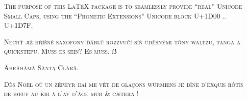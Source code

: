 \documentclass{scrartcl}
\begin{document}
\textsc{The purpose of this LaTeX package is to seamlessly provide “real” Unicode Small Caps, using the “Phonetic Extensions” Unicode block U+1D00 .. U+1D7F.}

\textsc{Nechť již hříšné saxofony ďáblů rozzvučí síň úděsnými tóny waltzu, tanga a quickstepu. Muß es sein? Es muss. ẞ}

\textsc{Äbráhàmâ Säntą Clårǎ.}

\textsc{Dès Noël où un zéphyr haï me vêt de glaçons würmiens je dîne d’exquis rôtis de bœuf au kir à l’aÿ d’âge mûr \& cætera !}
\end{document}
